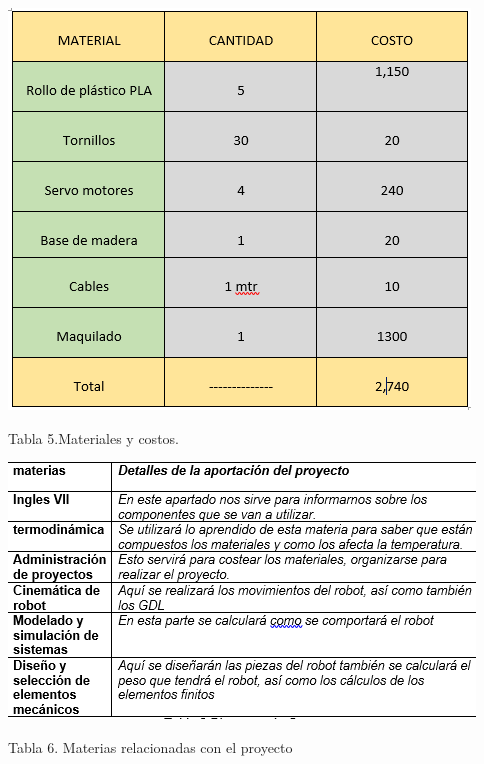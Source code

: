 \documentclass[12pt,letterpaper]{article}
\begin{document}
\newpage
\begin{center}
\includegraphics[scale=1]{costos.PNG} 
\end{center}
\begin{center}
Tabla 5.Materiales y costos.
\end{center}
\includegraphics[scale=1.3]{tabla 3.png}
\begin{center}
Tabla 6. Materias relacionadas con el proyecto
\end{center}
\end{document}
